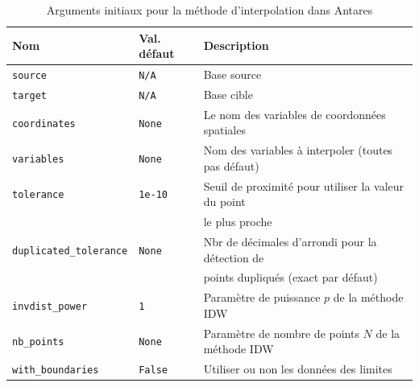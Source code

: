 \label{arguments}
\begin{table}[ht]
    \centering
    \begin{tabular}{|l|l|l|}
    \hline
    \textbf{Nom} & \textbf{Val. défaut} & \textbf{Description} \\ \hline %
    \texttt{source} & \texttt{N/A} & Base source \\
    \texttt{target} & \texttt{N/A} & Base cible \\
    \texttt{coordinates} & \texttt{None} & Le nom des variables de coordonnées spatiales \\
    \texttt{variables} & \texttt{None} & Nom des variables à interpoler (toutes pas défaut) \\
    \texttt{tolerance} & \texttt{1e-10} & Seuil de proximité pour utiliser la valeur du point \\
    \texttt{\phantom{-}} & \texttt{\phantom{-}} &  le plus proche \\
    \texttt{duplicated\_tolerance} & \texttt{None} & Nbr de décimales d'arrondi pour la détection de \\
    \texttt{\phantom{-}} & \texttt{\phantom{-}} & points dupliqués (exact par défaut) \\
    \texttt{invdist\_power} & \texttt{1} & Paramètre de puissance \(p\) de la méthode IDW \\
    \texttt{nb\_points} & \texttt{None} & Paramètre de nombre de points \(N\) de la méthode IDW \\
    \texttt{with\_boundaries} & \texttt{False} & Utiliser ou non les données des limites \\ \hline
    \end{tabular}
    \caption{Arguments initiaux pour la méthode d'interpolation dans Antares}
    \label{tab:arguments_interpolation1}
\end{table}

